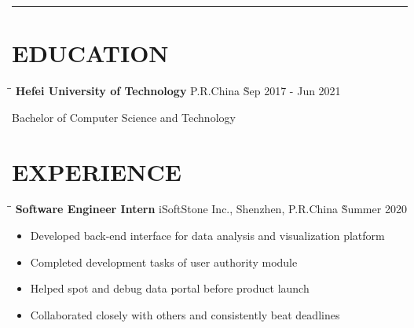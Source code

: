 \documentclass{res}
\begin{document}
 


\address{(86) 132-2563-9753 $\|$ \href{mailto:wangtzuhsiang@gmail.com}{wangtzuhsiang@gmail.com} 
        $\|$ \href{https://www.linkedin.com/in/zixiangwang/}{LinkedIn} 
        $\|$ \href{https://github.com/DolorHunter}{GitHub} 
        $\|$ \href{https://dolorhunter.com}{Blog}}

\begin{resume}

\vspace{-12pt}
\noindent\rule[0.25\baselineskip]{\textwidth}{1pt}    
\vspace{-20pt}  

\vspace{-0.1in}
\section{EDUCATION} 
    \vspace{-0.1in}	 
    \begin{tabbing}
    \hspace{3in}\= \hspace{2in}\= \kill %
    {\bf Hefei University of Technology} \>P.R.China \` Sep 2017 - Jun 2021
    \end{tabbing}\vspace{-20pt}      %
    Bachelor of Computer Science and Technology        

\vspace{-0.12in}
\section{EXPERIENCE}
    \vspace{-0.1in}	
    \begin{tabbing}
    \hspace{2.3in}\= \hspace{2.6in}\= \kill %
    {\bf Software Engineer Intern} \>iSoftStone Inc., Shenzhen, P.R.China    \` Summer 2020\\
    \end{tabbing}\vspace{-20pt}      %
    \vspace{-0.02in}
    \begin{itemize} \itemsep -2pt %
    \item Developed back-end interface for data analysis and visualization platform
    \item Completed development tasks of user authority module 
    \item Helped spot and debug data portal before product launch
    \item Collaborated closely with others and consistently beat deadlines
    \end{itemize}
   

\end{resume}
\end{document}
